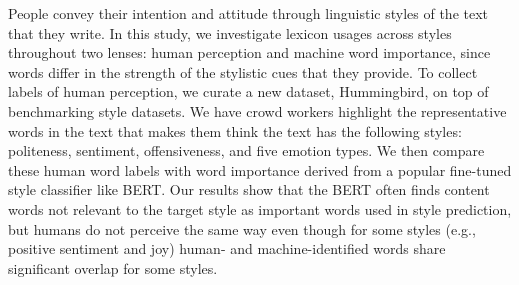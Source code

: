 People convey their intention and attitude through linguistic styles of the text that they write. In this study, we investigate lexicon usages across styles throughout two lenses: human perception and machine word importance, since words differ in the strength of the stylistic cues that they provide. To collect labels of human perception, we curate a new dataset, Hummingbird, on top of benchmarking style datasets. We have crowd workers highlight the representative words in the text that makes them think the text has the following styles: politeness, sentiment, offensiveness, and five emotion types. We then compare these human word labels with word importance derived from a popular fine-tuned style classifier like BERT. Our results show that the BERT often finds content words not relevant to the target style as important words used in style prediction, but humans do not perceive the same way even though for some styles (e.g., positive sentiment and joy) human- and machine-identified words share significant overlap for some styles.
